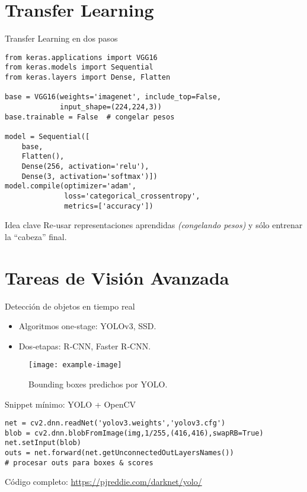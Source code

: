 \documentclass[12pt,spanish]{beamer}
\begin{document}
\section{Transfer Learning}
\begin{frame}[fragile]{Transfer Learning en dos pasos}
  \begin{verbatim}
from keras.applications import VGG16
from keras.models import Sequential
from keras.layers import Dense, Flatten

base = VGG16(weights='imagenet', include_top=False,
             input_shape=(224,224,3))
base.trainable = False  # congelar pesos

model = Sequential([
    base,
    Flatten(),
    Dense(256, activation='relu'),
    Dense(3, activation='softmax')])
model.compile(optimizer='adam',
              loss='categorical_crossentropy',
              metrics=['accuracy'])
  \end{verbatim}
  \begin{block}{Idea clave}
    Re‑usar representaciones aprendidas \textit{\small(congelando pesos)} y sólo entrenar la “cabeza” final.
  \end{block}
\end{frame}

\section{Tareas de Visión Avanzada}
\begin{frame}{Detección de objetos en tiempo real}
  \begin{itemize}
    \item Algoritmos one‑stage: YOLOv3, SSD.
    \item Dos‑etapas: R‑CNN, Faster R‑CNN.
  \end{itemize}
  \begin{figure}
    \centering
    \texttt{[image: example-image]}
    \caption{Bounding boxes predichos por YOLO.}
  \end{figure}
\end{frame}

\begin{frame}[fragile]{Snippet mínimo: YOLO + OpenCV}
  \begin{verbatim}
net = cv2.dnn.readNet('yolov3.weights','yolov3.cfg')
blob = cv2.dnn.blobFromImage(img,1/255,(416,416),swapRB=True)
net.setInput(blob)
outs = net.forward(net.getUnconnectedOutLayersNames())
# procesar outs para boxes & scores
  \end{verbatim}
  \footnotesize Código completo: \url{https://pjreddie.com/darknet/yolo/}
\end{frame}
\end{document}
